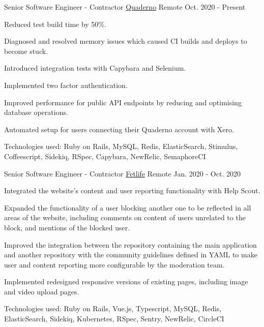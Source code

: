 \documentclass[11pt, a4paper]{awesome-cv}
\begin{document}
\begin{cventries}


  \cventry
    {Senior Software Engineer - Contractor} %
    {\href{https://quaderno.io/}{Quaderno}} %
    {Remote} %
    {Oct. 2020 - Present}
    {
      \begin{cvitems} %
        \item {Reduced test build time by 50\%.}
        \item {Diagnosed and resolved memory issues which caused CI builds and deploys to become stuck.}
        \item {Introduced integration tests with Capybara and Selenium.}
        \item {Implemented two factor authentication.}
        \item {Improved performance for public API endpoints by reducing and optimising database operations.}
        \item {Automated setup for users connecting their Quaderno account with Xero.}
        \item {Technologies used: Ruby on Rails, MySQL, Redis, ElasticSearch, Stimulus, Coffeescript, Sidekiq, RSpec, Capybara, NewRelic, SemaphoreCI}
      \end{cvitems}
    }

  \cventry
    {Senior Software Engineer - Contractor} %
    {\href{https://www.fetlife.com/}{Fetlife}} %
    {Remote} %
    {Jan. 2020 - Oct. 2020}
    {
      \begin{cvitems} %
        \item {Integrated the website's content and user reporting functionality with Help Scout.}
        \item {Expanded the functionality of a user blocking another one to be reflected in all areas of the website, including comments on content of users unrelated to the block, and mentions of the blocked user.}
        \item {Improved the integration between the repository containing the main application and another repository with the community guidelines defined in YAML to make user and content reporting more configurable by the moderation team.}
        \item {Implemented redesigned responsive versions of existing pages, including image and video upload pages.}
        \item {Technologies used: Ruby on Rails, Vue.js, Typescript, MySQL, Redis, ElasticSearch, Sidekiq, Kubernetes, RSpec, Sentry, NewRelic, CircleCI}
      \end{cvitems}
    }


\end{cventries}
\end{document}
